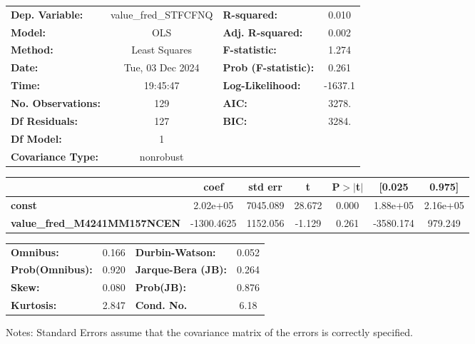 \begin{center}
\begin{tabular}{lclc}
\toprule
\textbf{Dep. Variable:}              & value\_fred\_STFCFNQ & \textbf{  R-squared:         } &     0.010   \\
\textbf{Model:}                      &         OLS          & \textbf{  Adj. R-squared:    } &     0.002   \\
\textbf{Method:}                     &    Least Squares     & \textbf{  F-statistic:       } &     1.274   \\
\textbf{Date:}                       &   Tue, 03 Dec 2024   & \textbf{  Prob (F-statistic):} &    0.261    \\
\textbf{Time:}                       &       19:45:47       & \textbf{  Log-Likelihood:    } &   -1637.1   \\
\textbf{No. Observations:}           &           129        & \textbf{  AIC:               } &     3278.   \\
\textbf{Df Residuals:}               &           127        & \textbf{  BIC:               } &     3284.   \\
\textbf{Df Model:}                   &             1        & \textbf{                     } &             \\
\textbf{Covariance Type:}            &      nonrobust       & \textbf{                     } &             \\
\bottomrule
\end{tabular}
\begin{tabular}{lcccccc}
                                     & \textbf{coef} & \textbf{std err} & \textbf{t} & \textbf{P$> |$t$|$} & \textbf{[0.025} & \textbf{0.975]}  \\
\midrule
\textbf{const}                       &     2.02e+05  &     7045.089     &    28.672  &         0.000        &     1.88e+05    &     2.16e+05     \\
\textbf{value\_fred\_M4241MM157NCEN} &   -1300.4625  &     1152.056     &    -1.129  &         0.261        &    -3580.174    &      979.249     \\
\bottomrule
\end{tabular}
\begin{tabular}{lclc}
\textbf{Omnibus:}       &  0.166 & \textbf{  Durbin-Watson:     } &    0.052  \\
\textbf{Prob(Omnibus):} &  0.920 & \textbf{  Jarque-Bera (JB):  } &    0.264  \\
\textbf{Skew:}          &  0.080 & \textbf{  Prob(JB):          } &    0.876  \\
\textbf{Kurtosis:}      &  2.847 & \textbf{  Cond. No.          } &     6.18  \\
\bottomrule
\end{tabular}
\end{center}

Notes: \newline
 [1] Standard Errors assume that the covariance matrix of the errors is correctly specified.
